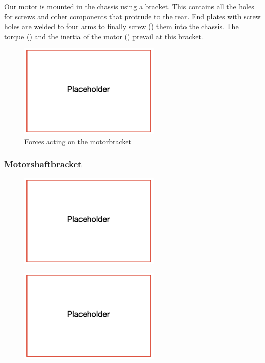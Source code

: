 Our motor is mounted in the chassis using a bracket. This contains all the holes for screws and other components that protrude to the rear. End plates with screw holes are welded to four arms to finally screw () them into the chassis. The torque () and the inertia of the motor () prevail at this bracket.

\begin{figure}[H]
\centering
\includegraphics[width=0.6\textwidth]{texfiles/mech/eimg/propulsion/placeholder}
\caption{Forces acting on the motorbracket}
\label{fig:motorbracket_forces}
\end{figure}

\subsubsection{Motorshaftbracket}
\begin{figure}[H]
\centering
\includegraphics[width=0.6\textwidth]{texfiles/mech/eimg/propulsion/placeholder}
\caption{}
\label{}
\end{figure}

\begin{figure}[H]
\centering
\includegraphics[width=0.6\textwidth]{texfiles/mech/eimg/propulsion/placeholder}
\caption{}
\label{}
\end{figure}

